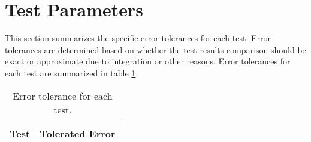 \section{Test Parameters}

This section summarizes the  specific error tolerances for each test. Error tolerances are determined based on whether the test results comparison should be exact or approximate due to integration or other reasons. Error tolerances for each test are summarized in table \ref{tab:errortol}. \\
	
	\begin{table}[htbp]
		\caption{Error tolerance for each test.}
		\label{tab:errortol}
		\centering \fontsize{10}{10}\selectfont
		\begin{tabular}{ c | c } %
			\hline
			\textbf{Test}   							    & \textbf{Tolerated Error} 						  \\ \hline
		\end{tabular}
	\end{table}